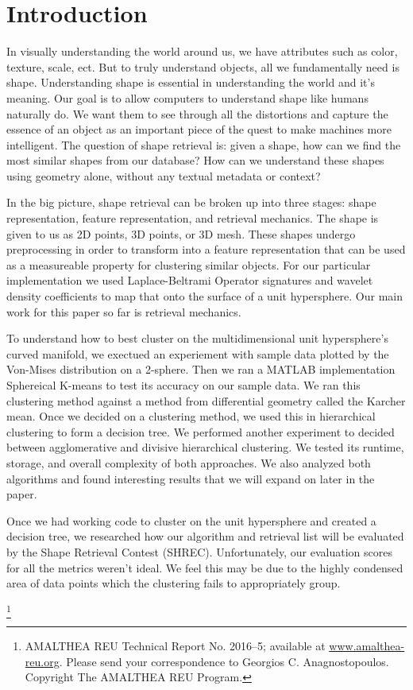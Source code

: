 \documentclass[../tech_report_1.tex]{subfiles}
\newcommand\blfootnote[1]{%
  \begingroup
  \renewcommand\thefootnote{}\footnote{#1}%
  \addtocounter{footnote}{-1}%
  \endgroup
}
\begin{document}
\section{Introduction}
In visually understanding the world around us, we have attributes such as color, texture, scale, ect. But to truly understand objects, all we fundamentally need is shape. Understanding shape is essential in understanding the world and it's meaning. Our goal is to allow computers to understand shape like humans naturally do. We want them to see through all the distortions and capture the essence of an object as an important piece of the quest to make machines more intelligent. The question of shape retrieval is: given a shape, how can we find the most similar shapes from our database? How can we understand these shapes using geometry alone, without any textual metadata or context? 

In the big picture, shape retrieval can be broken up into three stages:
shape representation, feature representation, and retrieval mechanics. The shape is given to us as 2D points, 3D points, or 3D mesh. These shapes undergo preprocessing in order to transform into a feature representation that can be used as a measureable property for clustering similar objects. For our particular implementation we used Laplace-Beltrami Operator signatures and wavelet density coefficients to map that onto the surface of a unit hypersphere. Our main work for this paper so far is retrieval mechanics.

To understand how to best cluster on the multidimensional unit hypersphere's curved manifold, we exectued an experiement with sample data plotted by the Von-Mises distribution on a 2-sphere. Then we ran a MATLAB implementation Sphereical K-means to test its accuracy on our sample data. We ran this clustering method against a method from differential geometry called the Karcher mean. Once we decided on a clustering method, we used this in hierarchical clustering to form a decision tree. We performed another experiment to decided between agglomerative and divisive hierarchical clustering. We tested its runtime, storage, and overall complexity of both approaches. We also analyzed both algorithms and found interesting results that we will expand on later in the paper.

Once we had working code to cluster on the unit hypersphere and
created a decision tree, we researched how our algorithm and retrieval list will be evaluated by the Shape Retrieval Contest (SHREC). Unfortunately, our evaluation scores for all the metrics weren't ideal. We feel this may be due to the highly condensed area of data points which the clustering fails to appropriately group.

\blfootnote{AMALTHEA REU Technical Report No. 2016–5; available at \href{www.amalthea-reu.org}{www.amalthea-reu.org}. Please send your correspondence to Georgios C. Anagnostopoulos. Copyright \textcopyright \thickspace 2016 The AMALTHEA REU Program.}
\end{document}
